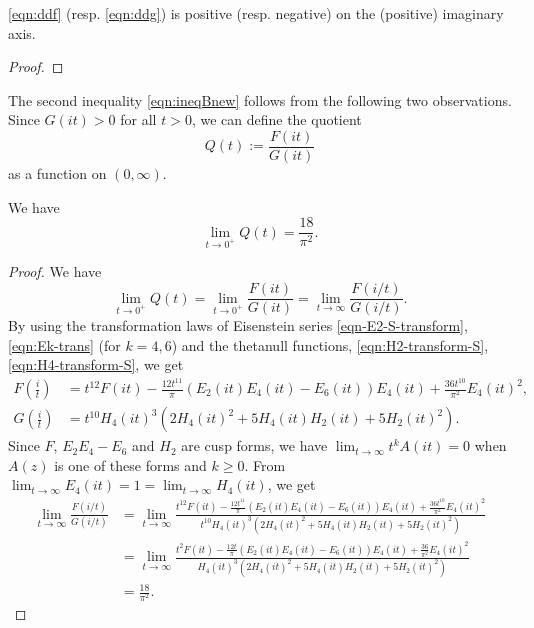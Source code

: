 \begin{corollary}\label{cor:FGde}
\eqref{eqn:ddf} (resp. \eqref{eqn:ddg}) is positive (resp. negative) on the (positive) imaginary axis.
\end{corollary}
\begin{proof}
\end{proof}


The second inequality \eqref{eqn:ineqBnew} follows from the following two observations.
Since $G(it) > 0$ for all $t > 0$, we can define the quotient
\begin{equation}\label{eqn:Q}
  Q(t) := \frac{F(it)}{G(it)}
\end{equation}
as a function on $(0, \infty)$.

\begin{lemma}\label{lem:limQ}
We have
\begin{equation}\label{eqn:limQ}
  \lim_{t \to 0^+} Q(t) = \frac{18}{\pi^2}.
\end{equation}
\end{lemma}

\begin{proof}
We have
\begin{equation}
  \lim_{t \to 0^+} Q(t) = \lim_{t \to 0^+} \frac{F(it)}{G(it)} = \lim_{t \to \infty} \frac{F(i/t)}{G(i/t)}.
\end{equation}
By using the transformation laws of Eisenstein series \eqref{eqn-E2-S-transform}, \eqref{eqn:Ek-trans} (for $k = 4, 6$) and the thetanull functions, \eqref{eqn:H2-transform-S}, \eqref{eqn:H4-transform-S}, we get
\begin{align}
    F\left(\frac{i}{t}\right) &= t^{12} F(it) - \frac{12t^{11}}{\pi} (E_2(it)E_4(it) - E_6(it))E_4(it) + \frac{36t^{10}}{\pi^2}E_4(it)^2, \\
    G\left(\frac{i}{t}\right) &= t^{10} H_{4}(it)^{3}(2H_{4}(it)^{2} + 5 H_{4}(it)H_{2}(it) + 5 H_{2}(it)^{2}).
\end{align}
Since $F$, $E_2 E_4 - E_6$ and $H_2$ are cusp forms, we have $\lim_{t \to \infty}t^k A(it) = 0$ when $A(z)$ is one of these forms and $k \geq 0$.
From $\lim_{t \to \infty} E_4(it) = 1 = \lim_{t \to \infty}H_{4}(it)$, we get
\begin{align}
    \lim_{t \to \infty} \frac{F(i/t)}{G(i/t)}
    &= \lim_{t \to \infty} \frac{t^{12} F(it) - \frac{12t^{11}}{\pi} (E_2(it)E_4(it) - E_6(it))E_4(it) + \frac{36t^{10}}{\pi^2}E_4(it)^2}{t^{10} H_{4}(it)^{3}(2H_{4}(it)^{2} + 5 H_{4}(it)H_{2}(it) + 5 H_{2}(it)^{2})} \\
    &= \lim_{t \to \infty} \frac{t^{2} F(it) - \frac{12t}{\pi} (E_2(it)E_4(it) - E_6(it))E_4(it) + \frac{36}{\pi^2}E_4(it)^2}{H_{4}(it)^{3}(2H_{4}(it)^{2} + 5 H_{4}(it)H_{2}(it) + 5 H_{2}(it)^{2})} \\
    &= \frac{18}{\pi^2}.
\end{align}
\end{proof}


